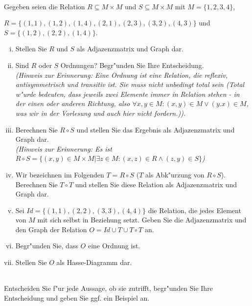 \\
Gegeben seien die Relation $R\subseteq M\times M$ und $S\subseteq M\times M$ mit $M=\{1,2,3,4\}$, 

$R=\{(1,1),(1,2),(1,4),(2,1),(2,3),(3,2),(4,3)\}$ und $S=\{(1,2),(2,2),(1,4)\}$.
\begin{enumerate}[(i)]
\item Stellen Sie $R$ und $S$ als Adjazenzmatrix und Graph dar.
\item Sind $R$ oder $S$ Ordnungen? Begr"unden Sie Ihre Entscheidung.\\
\textit{(Hinweis zur Erinnerung: Eine Ordnung ist eine Relation, die reflexiv, antisymmetrisch und transitiv ist. Sie muss nicht unbedingt total sein (Total w"urde bedeuten, dass jeweils zwei Elemente immer in Relation stehen - in der einen oder anderen Richtung, also $\forall x,y\in M:(x,y)\in M\vee (y.x)\in M$, was wir in der Vorlesung und auch hier nicht fordern.)).}
\item Berechnen Sie $R\circ S$ und stellen Sie das Ergebnis als Adjazenzmatrix und Graph dar.\\
\textit{(Hinweis zur Erinnerung: Es ist $R\circ S=\{(x,y)\in M\times M|\exists z\in M: (x,z)\in R\wedge (z,y)\in S\}$)}
\item Wir bezeichnen im Folgenden $T=R\circ S$ ($T$ als Abk"urzung von $R\circ S$). Berechnen Sie $T\circ T$ und stellen Sie diese Relation als Adjazenzmatrix und Graph dar.
\item Sei $Id=\{(1,1),(2,2),(3,3),(4,4)\}$ die Relation, die jedes Element von $M$ mit sich selbst in Beziehung setzt. Geben Sie die Adjazenzmatrix und den Graph der Relation $O=Id\cup T\cup T\circ T$ an.
\item Begr"unden Sie, dass $O$ eine Ordnung ist.
\item Stellen Sie $O$ als Hasse-Diagramm dar.

\end{enumerate}

\\
Entscheiden Sie f"ur jede Aussage, ob sie zutrifft, begr"unden Sie Ihre Entscheidung und geben Sie ggf. ein Beispiel an.

